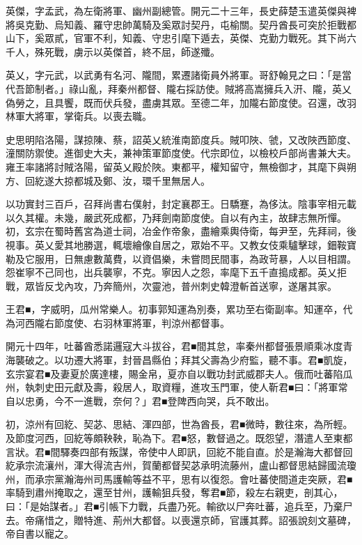 \begin{pinyinscope}
 英傑，字孟武，為左衛將軍、幽州副總管。開元二十三年，長史薛楚玉遣英傑與裨將吳克勤、烏知義、羅守忠帥萬騎及奚眾討契丹，屯榆關。契丹酋長可突於拒戰都山下，奚眾貳，官軍不利，知義、守忠引麾下遁去，英傑、克勤力戰死。其下尚六千人，殊死戰，虜示以英傑首，終不屈，師遂殲。



 英乂，字元武，以武勇有名河、隴間，累遷諸衛員外將軍。哥舒翰見之曰：「是當代吾節制者。」祿山亂，拜秦州都督、隴右採訪使。賊將高嵩擁兵入汧、隴，英乂偽勞之，且具饗，既而伏兵發，盡虜其眾。至德二年，加隴右節度使。召還，改羽林軍大將軍，掌衛兵。以喪去職。



 史思明陷洛陽，謀掠陳、蔡，詔英乂統淮南節度兵。賊叩陜、虢，又改陜西節度、潼關防禦使。進御史大夫，兼神策軍節度使。代宗即位，以檢校戶部尚書兼大夫。雍王率諸將討賊洛陽，留英乂殿於陜。東都平，權知留守，無檢御才，其麾下與朔方、回紇遂大掠都城及鄭、汝，環千里無居人。



 以功實封三百戶，召拜尚書右僕射，封定襄郡王。日驕蹇，為侈汰。陰事宰相元載以久其權。未幾，嚴武死成都，乃拜劍南節度使。自以有內主，故肆志無所憚。初，玄宗在蜀時舊宮為道士祠，冶金作帝象，盡繪乘輿侍衛，每尹至，先拜祠，後視事。英乂愛其地勝選，輒壞繪像自居之，眾始不平。又教女伎乘驢擊球，鈿鞍寶勒及它服用，日無慮數萬費，以資倡樂，未嘗問民間事，為政苛暴，人以目相謂。怨崔寧不己同也，出兵襲寧，不克。寧因人之怨，率麾下五千直搗成都。英乂拒戰，眾皆反戈內攻，乃奔簡州，次靈池，普州刺史韓澄斬首送寧，遂屠其家。



 王君■，字威明，瓜州常樂人。初事郭知運為別奏，累功至右衛副率。知運卒，代為河西隴右節度使、右羽林軍將軍，判涼州都督事。



 開元十四年，吐蕃酋悉諾邏寇大斗拔谷，君■間其怠，率秦州都督張景順乘冰度青海襲破之。以功遷大將軍，封晉昌縣伯；拜其父壽為少府監，聽不事。君■凱旋，玄宗宴君■及妻夏於廣達樓，賜金帛，夏亦自以戰功封武威郡夫人。俄而吐蕃陷瓜州，執刺史田元獻及壽，殺居人，取資糧，進攻玉門軍，使人靳君■曰：「將軍常自以忠勇，今不一進戰，奈何？」君■登陴西向哭，兵不敢出。



 初，涼州有回紇、契苾、思結、渾四部，世為酋長，君■微時，數往來，為所輕。及節度河西，回紇等頗鞅鞅，恥為下。君■怒，數督過之。既怨望，潛遣人至東都言狀。君■間驛奏四部有叛謀，帝使中人即訊，回紇不能自直。於是瀚海大都督回紇承宗流瀼州，渾大得流吉州，賀蘭都督契苾承明流藤州，盧山都督思結歸國流瓊州，而承宗黨瀚海州司馬護輸等益不平，思有以復怨。會吐蕃使間道走突厥，君■率騎到肅州掩取之，還至甘州，護輸狙兵發，奪君■節，殺左右親吏，剖其心，曰：「是始謀者。」君■引帳下力戰，兵盡乃死。輸欲以尸奔吐蕃，追兵至，乃棄尸去。帝痛惜之，贈特進、荊州大都督。以喪還京師，官護其葬。詔張說刻文墓碑，帝自書以寵之。




\end{pinyinscope}
